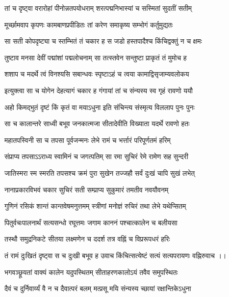 \twolineshloka
{तां च दृष्ट्वा वरारोहां पीनोन्नतपयोधराम्}
{शरत्पद्मनिभास्यां च सस्मितां सुदतीं सतीम्}%

\twolineshloka
{मूर्च्छामवाप कृपणः कामबाणप्रपीडितः}
{तां करेण समाकृष्य सम्भोगं कर्तुमुद्यतः}%

\twolineshloka
{सा सती कोपदृष्ट्या च स्तम्भितं तं चकार ह}
{स जडो हस्तपादैश्च किंचिद्वक्तुं न च क्षमः}%

\twolineshloka
{तुष्टाव मनसा देवीं पद्मांशां पद्मलोचनाम्}
{सा तत्स्तवेन सन्तुष्टा प्राकृतं तं मुमोच ह}%

\twolineshloka
{शशाप च मदर्थे त्वं विनश्यसि सबान्धवः}
{स्पृष्टाऽहं च त्वया कामाद्विसृजाम्यवलोकय}%

\twolineshloka
{इत्युक्त्वा सा च योगेन देहत्यागं चकार ह}
{गंगायां तां च संन्यस्य स्व गृहं रावणो ययौ}%

\twolineshloka
{अहो किमद्भुतं दृष्टं किं कृतं वा मयाऽधुना}
{इति संचिन्त्य संस्मृत्य विललाप पुनः पुनः}%

\twolineshloka
{सा च कालान्तरे साध्वी बभूव जनकात्मजा}
{सीतादेवीति विख्याता यदर्थे रावणो हतः}%

\twolineshloka
{महातपस्विनी सा च तपसा पूर्वजन्मनः}
{लेभे रामं च भर्त्तारं परिपूर्णतमं हरिम्}%

\twolineshloka
{संप्राप्य तपसाऽऽराध्य स्वामिनं च जगत्पतिम्}
{सा रमा सुचिरं रेमे रामेण सह सुन्दरी}%

\twolineshloka
{जातिस्मरा स्म स्मरति तपसश्च क्रमं पुरा}
{सुखेन तज्जहौ सर्वं दुःखं चापि सुखं लभेत्}%

\twolineshloka
{नानाप्रकारविभवं चकार सुचिरं सती}
{सम्प्राप्य सुकुमारं तमतीव नवयौवनम्}%

\twolineshloka
{गुणिनं रसिकं शान्तं कान्तवेषमनुत्तमम्}
{स्त्रीणां मनोज्ञं रुचिरं तथा लेभे यथेप्सितम्}%

\twolineshloka
{पितुर्वचःपालनार्थं सत्यसन्धो रघूत्तमः}
{जगाम काननं पश्चात्कालेन च बलीयसा}%

\twolineshloka
{तस्थौ समुद्रनिकटे सीतया लक्ष्मणेन च}
{ददर्श तत्र वह्निं च विप्ररूपधरं हरिः}%

\twolineshloka
{तं रामं दुःखितं दृष्ट्वा स च दुःखी बभूव ह}
{उवाच किंचित्सत्येष्टं सत्यं सत्यपरायणः}%
वह्निरुवाच ।।

\twolineshloka
{भगवञ्छ्रूयतां वाक्यं कालेन यदुपस्थितम्}
{सीताहरणकालोऽयं तवैव समुपस्थितः}%

\twolineshloka
{दैवं च दुर्निवार्य्यं वै न च दैवात्परं बलम्}
{मत्प्रसू मयि संन्यस्य च्छायां रक्षान्तिकेऽधुना}%

